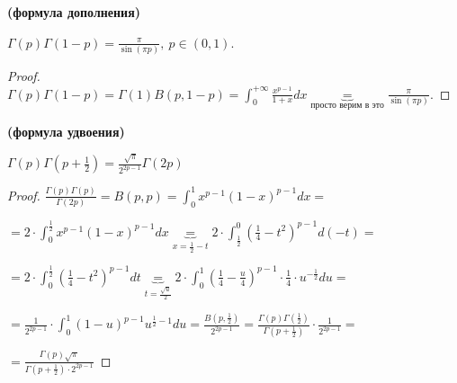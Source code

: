 \begin{consequence} \textbf{(формула дополнения)}

    $\Gamma(p) \Gamma(1-p) = \frac{\pi}{\sin(\pi p)}, \ p \in (0, 1)$.
\end{consequence}
\begin{proof}
    $\Gamma(p) \Gamma(1 - p) = \Gamma(1) B(p, 1 - p) = \int_{0}^{+\infty} { \frac{x^{p-1}}{1+x} dx } \underbrace{=}_{\text{просто верим в это}} \frac{\pi}{\sin(\pi p)}$.
\end{proof}



\begin{consequence} \textbf{(формула удвоения)}

    $\Gamma(p)\Gamma(p + \frac{1}{2}) = \frac{\sqrt[]{\pi}}{2^{2p - 1}}\Gamma(2p)$
\end{consequence}

\begin{proof}


    $\frac{\Gamma(p) \Gamma(p)}{\Gamma(2p)} = B(p, p) = \int_{0}^{1} {x^{p - 1} (1 - x)^{p - 1} dx} =$
    
    $= 2 \cdot \int_{0}^{\frac{1}{2}} { x^{p - 1} (1 - x)^{p - 1} dx } \underbrace{=}_{x = \frac{1}{2} - t} 2 \cdot \int_{\frac{1}{2}}^{0} { \left( \frac{1}{4} - t^2 \right)^{p - 1} d(-t) } =$
    
    $= 2 \cdot \int_{0}^{\frac{1}{2}} { \left( \frac{1}{4} - t^2 \right)^{p - 1} dt } \underbrace{=}_{t = \frac{\sqrt{u}}{2}} 2 \cdot \int_{0}^{1} {\left( \frac{1}{4} - \frac{u}{4} \right)^{p-1} \cdot \frac{1}{4} \cdot u^{-\frac{1}{2}} du} =$
    
    $= \frac{1}{2^{2p - 1}} \cdot \int_{0}^{1} { (1 - u)^{p - 1} u^{\frac{1}{2} - 1} du } = \frac{B(p, \frac{1}{2})}{2^{2p - 1}} = \frac{\Gamma(p) \Gamma(\frac{1}{2})}{\Gamma(p + \frac{1}{2})} \cdot \frac{1}{2^{2p - 1}} =$
    
    $= \frac{\Gamma(p) \sqrt{\pi}}{\Gamma(p + \frac{1}{2}) \cdot 2^{2p - 1}}$

\end{proof}


